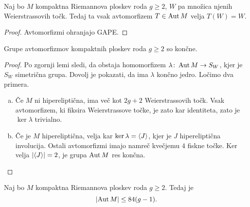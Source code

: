 \begin{lema}
Naj bo $M$ kompaktna Riemannova ploskev roda $g \geq 2$, $W$ pa
množica njenih Weierstrassovih točk. Tedaj ta vsak avtomorfizem
$T \in \operatorname{Aut} M$ velja $T(W) = W$.
\end{lema}

\begin{proof}
Avtomorfizmi ohranjajo GAPE.
\end{proof}

\begin{izrek}[Schwarz]
Grupe avtomorfizmov kompaktnih ploskev roda $g \geq 2$ so končne.
\end{izrek}

\begin{proof}
Po zgornji lemi sledi, da obstaja homomorfizem
$\lambda \colon \operatorname{Aut} M \to S_W$, kjer je $S_W$ simetrična grupa.
Dovolj je pokazati, da ima $\lambda$ končno jedro. Ločimo dva
primera.

\begin{enumerate}[a)]
\item Če $M$ ni hipereliptična, ima več kot $2g + 2$
Weierstrassovih točk. Vsak avtomorfizem, ki fiksira Weierstrassove
točke, je zato kar identiteta, zato je $\ker \lambda$ trivialno.

\item Če je $M$ hipereliptična, velja kar
$\ker \lambda = \left\langle J\right\rangle$, kjer je $J$ hipereliptična involucija.
Ostali avtomorfizmi imajo namreč kvečjemu $4$ fiskne točke. Ker
velja $\left\lvert \left\langle J\right\rangle\right\rvert = 2$, je grupa $\operatorname{Aut} M$ res končna. \qedhere
\end{enumerate}
\end{proof}

\begin{izrek}[Hurwitz]
Naj bo $M$ kompaktna Riemannova ploskev roda $g \geq 2$. Tedaj je
\[
\left\lvert \operatorname{Aut} M\right\rvert \leq 84(g-1).
\]
\end{izrek}

